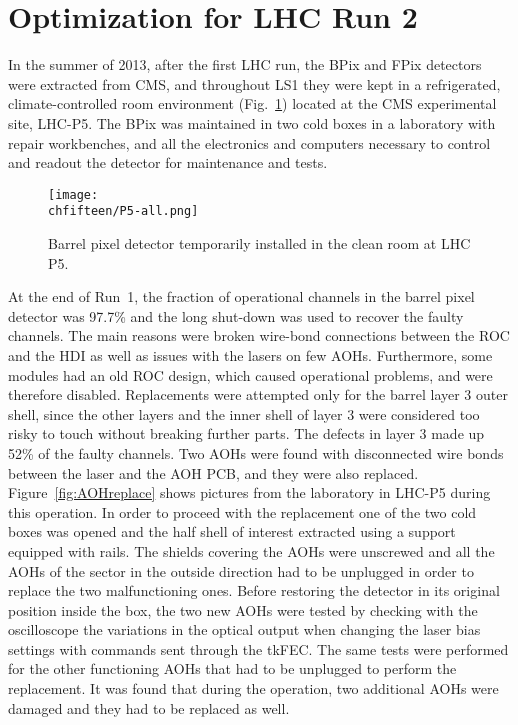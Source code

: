 \section{Optimization for LHC Run 2}

In the summer of 2013, after the first LHC run, the BPix and FPix detectors were extracted from CMS, and throughout LS1 they were kept in a refrigerated, climate-controlled room environment (Fig.~\ref{fig:PixP5}) located at the CMS experimental site, LHC-P5. The BPix was maintained in two cold boxes in a laboratory with repair workbenches, and all the electronics and computers necessary to control and readout the detector for maintenance and tests.

\begin{figure}[!htb]
 \begin{center}
 \texttt{[image: \\chfifteen/P5-all.png]}
 \end{center}
 \caption{Barrel pixel detector temporarily installed in the clean room at LHC P5.}
 \label{fig:PixP5}
\end{figure}

At the end of Run~1, the fraction of operational channels in the barrel pixel detector was 97.7\% and the long shut-down was used to recover the faulty channels.
The main reasons were broken wire-bond connections between the ROC and the HDI as well as issues with the lasers on few AOHs.
Furthermore, some modules had an old ROC design, which caused operational problems, and were therefore disabled.
Replacements were attempted only for the barrel layer 3 outer shell, since the other layers and the inner shell of layer 3 were considered too risky to touch without breaking further parts.
The defects in layer 3 made up 52\% of the faulty channels.
Two AOHs were found with disconnected wire bonds between the laser and the AOH PCB, and they were also replaced. Figure~\ref{fig:AOHreplace} shows pictures from the laboratory in LHC-P5 during this operation.
In order to proceed with the replacement one of the two cold boxes was opened and the half shell of interest extracted using a support equipped with rails.
The shields covering the AOHs were unscrewed and all the AOHs of the sector in the outside direction had to be unplugged in order to replace the two malfunctioning ones.
Before restoring the detector in its original position inside the box, the two new AOHs were tested by checking with the oscilloscope the variations in the optical output when changing the laser bias settings with commands sent through the tkFEC. The same tests were performed for the other functioning AOHs that had to be unplugged to perform the replacement. It was found that during the operation, two additional AOHs were damaged and they had to be replaced as well.

